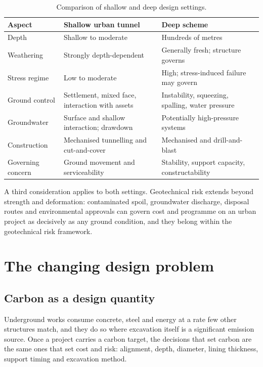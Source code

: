 \begin{table}[htbp]
\caption{Comparison of shallow and deep design settings.}
\label{tab:shallow-deep}
\centering
\small
\begin{tabularx}{\textwidth}{l X X}
\toprule
\textbf{Aspect} & \textbf{Shallow urban tunnel} & \textbf{Deep scheme} \\
\midrule
Depth & Shallow to moderate & Hundreds of metres \\
Weathering & Strongly depth-dependent & Generally fresh; structure governs \\
Stress regime & Low to moderate & High; stress-induced failure may govern \\
Ground control & Settlement, mixed face, interaction with assets & Instability, squeezing, spalling, water pressure \\
Groundwater & Surface and shallow interaction; drawdown & Potentially high-pressure systems \\
Construction & Mechanised tunnelling and cut-and-cover & Mechanised and drill-and-blast \\
Governing concern & Ground movement and serviceability & Stability, support capacity, constructability \\
\bottomrule
\end{tabularx}
\end{table}

A third consideration applies to both settings. Geotechnical risk extends beyond
strength and deformation: contaminated spoil, groundwater discharge, disposal
routes and environmental approvals can govern cost and programme on an urban
project as decisively as any ground condition, and they belong within
the geotechnical risk framework.

\section{The changing design problem}
\label{sec:changing-problem}

\subsection{Carbon as a design quantity}
\label{sec:carbon-driver}

Underground works consume concrete, steel and energy at a rate few other
structures match, and they do so where excavation itself is a significant
emission source. Once a project carries a carbon target, the decisions that
set carbon are the same ones that set cost and risk: alignment, depth,
diameter, lining thickness, support timing and excavation method.

